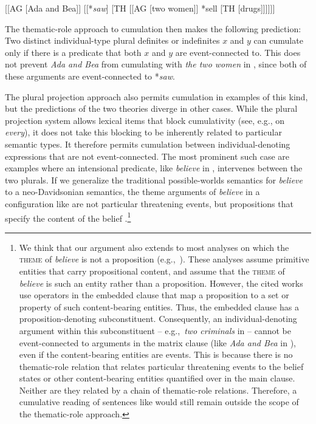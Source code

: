 \documentclass[output=paper]{langscibook}
\begin{document}
\ea \label{has-sch:questi-bb}  [[AG [Ada and Bea]] [[*\textit{saw}] [TH [[AG [two women]] *sell [TH [drugs]]]]]]
\z

\noindent The thematic-role approach to cumulation then makes the following prediction: Two distinct individual-type plural definites or indefinites $x$ and $y$ can cumulate only if there is a predicate that both $x$ and $y$ are event-connected to. This does not prevent \textit{Ada and Bea} from cumulating with \textit{the two women} in , since both of these arguments are event-connected to *\textit{saw}.

The plural projection approach also permits cumulation in examples of this kind, but the predictions of the two theories diverge in other cases. While the plural projection system allows lexical items that block cumulativity (see, e.g., \citealt{Haslinger:2018a} on \textit{every}), it does not take this blocking to be inherently related to particular semantic types. It therefore permits cumulation between individual-denoting expressions that are not event-connected. The most prominent such case are examples where an intensional predicate, like \textit{believe} in , intervenes between the two plurals. If we generalize the traditional possible-worlds semantics for \textit{believe} \citep{Hintikka:1969} to a neo-Davidsonian semantics, the theme arguments of \textit{believe} in a configuration like  are not particular threatening events, but propositions that specify the content of the belief .\footnote{We think that our argument also extends to most analyses on which the \textsc{theme} of \textit{believe} is not a proposition (e.g.,~\citealt{Kratzer:2006,Moulton:2009,Moulton:2015,Hacquard:2006,Hacquard:2010}). These analyses assume primitive entities that carry propositional content, and assume that the \textsc{theme} of \textit{believe} is such an entity rather than a proposition. However, the cited works use operators in the embedded clause that map a proposition to a set or property of such content-bearing entities. Thus, the embedded clause has a proposition-denoting subconstituent. Consequently, an individual-denoting argument within this subconstituent -- e.g.,~\textit{two criminals} in  -- cannot be event-connected to arguments in the matrix clause (like \textit{Ada and Bea} in ), even if the content-bearing entities are events. This is because there is no thematic-role relation that relates particular threatening events to the belief states or other content-bearing entities quantified over in the main clause. Neither are they related by a chain of thematic-role relations. Therefore, a cumulative reading of sentences like  would still remain outside the scope of the thematic-role approach.
}
\end{document}
